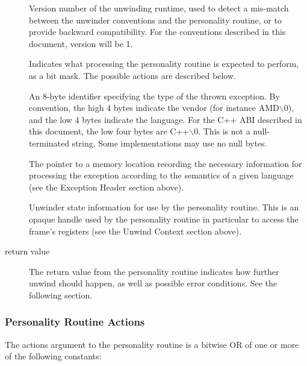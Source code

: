 \begin{description}
\item[] Version number of the unwinding runtime,
   used to detect a mis-match between the unwinder conventions and the
   personality routine, or to provide backward compatibility. For the
   conventions described in this document, version will be 1.
\item[] Indicates what processing the personality routine
   is expected to perform, as a bit mask. The possible actions are
   described below.
\item[] An 8-byte identifier specifying the type of the
   thrown exception. By convention, the high 4 bytes indicate the vendor
   (for instance AMD$\backslash$0), and the low 4 bytes indicate
   the language.  For the C++ ABI described in this document, the low
   four bytes are C++$\backslash$0.  This is not a null-terminated string.
   Some implementations may use no null bytes.
\item[] The pointer to a memory location recording the
   necessary information for processing the exception according to the
   semantics of a given language (see the Exception Header section above).
\item[] Unwinder state information for use by the personality routine.
   This is an opaque handle used by the personality routine in particular
   to access the frame's registers (see the Unwind Context section above).
\item[return value] The return value from the personality routine indicates
   how further unwind should happen, as well as possible error conditions.
   See the following section.
\end{description}

\subsubsection{Personality Routine Actions}

The actions argument to the personality routine is a bitwise OR of one or
more of the following constants: \\


